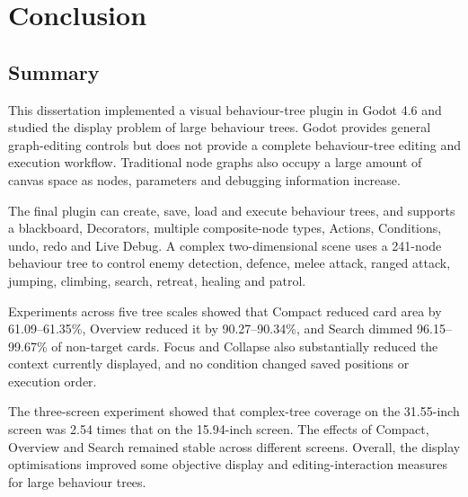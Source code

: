 \chapter{Conclusion}
\label{ch:conclusion}

\section{Summary}

This dissertation implemented a visual behaviour-tree plugin in Godot 4.6 and studied the display problem of large behaviour trees. Godot provides general graph-editing controls but does not provide a complete behaviour-tree editing and execution workflow. Traditional node graphs also occupy a large amount of canvas space as nodes, parameters and debugging information increase.

The final plugin can create, save, load and execute behaviour trees, and supports a blackboard, Decorators, multiple composite-node types, Actions, Conditions, undo, redo and Live Debug. A complex two-dimensional scene uses a 241-node behaviour tree to control enemy detection, defence, melee attack, ranged attack, jumping, climbing, search, retreat, healing and patrol.

Experiments across five tree scales showed that Compact reduced card area by 61.09--61.35\%, Overview reduced it by 90.27--90.34\%, and Search dimmed 96.15--99.67\% of non-target cards. Focus and Collapse also substantially reduced the context currently displayed, and no condition changed saved positions or execution order.

The three-screen experiment showed that complex-tree coverage on the 31.55-inch screen was 2.54 times that on the 15.94-inch screen. The effects of Compact, Overview and Search remained stable across different screens. Overall, the display optimisations improved some objective display and editing-interaction measures for large behaviour trees.

